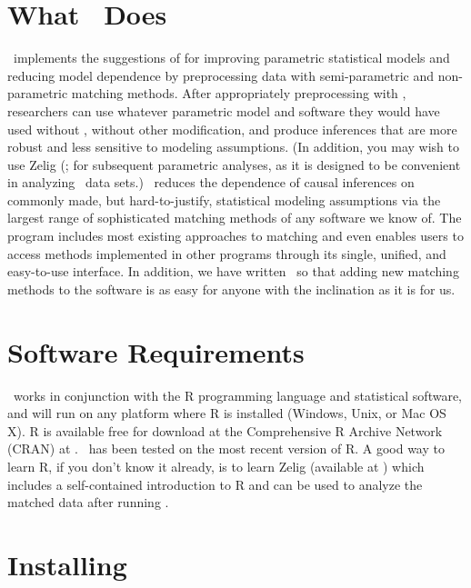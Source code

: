 
\section{What \MatchIt\ Does}

\MatchIt\ implements the suggestions of \citet*{HoImaKin07} for
improving parametric statistical models and reducing model dependence
by preprocessing data with semi-parametric and non-parametric matching
methods.  After appropriately preprocessing with \MatchIt, researchers
can use whatever parametric model and software they would have used
without \MatchIt, without other modification, and produce inferences
that are more robust and less sensitive to modeling assumptions.  (In
addition, you may wish to use Zelig
(;
\citealt{ImaKinLau06} for subsequent parametric analyses, as it is
designed to be convenient in analyzing \MatchIt\ data sets.)
\MatchIt\ reduces the dependence of causal inferences on commonly
made, but hard-to-justify, statistical modeling assumptions via the
largest range of sophisticated matching methods of any software we
know of.  The program includes most existing approaches to matching
and even enables users to access methods implemented in other programs
through its single, unified, and easy-to-use interface.  In addition,
we have written \MatchIt\ so that adding new matching methods to the
software is as easy for anyone with the inclination as it is for us.

\section{Software Requirements} 
\label{sec:require}

\MatchIt\ works in conjunction with the R programming language and
statistical software, and will run on any platform where R is
installed (Windows, Unix, or Mac OS X).  R is available free for
download at the Comprehensive R Archive Network (CRAN) at
.
\MatchIt\ has been tested on the most recent version of R.  A good way
to learn R, if you don't know it already, is to learn Zelig (available
at
)
which includes a self-contained introduction to R and can be used to
analyze the matched data after running \MatchIt.

\section{Installing \MatchIt}
\label{sec:install}


